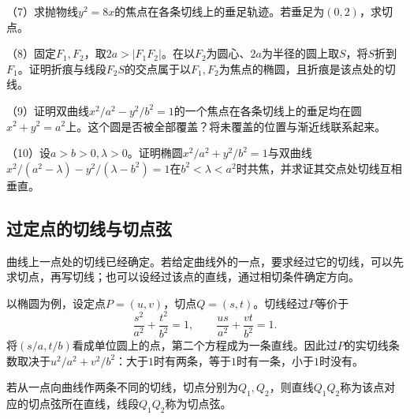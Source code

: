 \begin{exercise}
\begin{samepage}
（7）求抛物线\(y^2=8x\)的焦点在各条切线上的垂足轨迹。若垂足为\((0,2)\)，求切点。
\par
\end{samepage}

\begin{samepage}
（8）固定\(F_1,F_2\)，取\(2a>|F_1F_2|\)。在以\(F_2\)为圆心、\(2a\)为半径的圆上取\(S\)，将\(S\)折到\(F_1\)。证明折痕与线段\(F_2S\)的交点属于以\(F_1,F_2\)为焦点的椭圆，且折痕是该点处的切线。
\par
\end{samepage}

\begin{samepage}
（9）证明双曲线\(x^2/a^2-y^2/b^2=1\)的一个焦点在各条切线上的垂足均在圆\(x^2+y^2=a^2\)上。这个圆是否被全部覆盖？将未覆盖的位置与渐近线联系起来。
\par
\end{samepage}

\begin{samepage}
（10）设\(a>b>0,\lambda>0\)。证明椭圆\(x^2/a^2+y^2/b^2=1\)与双曲线\(x^2/(a^2-\lambda)-y^2/(\lambda-b^2)=1\)在\(b^2<\lambda<a^2\)时共焦，并求证其交点处切线互相垂直。
\par
\end{samepage}
\end{exercise}

\subsection{过定点的切线与切点弦}
\label{subsec:quadratic-tangents-from-a-point}

曲线上一点处的切线已经确定。若给定曲线外的一点，要求经过它的切线，可以先求切点，再写切线；也可以设经过该点的直线，通过相切条件确定方向。

以椭圆为例，设定点\(P=(u,v)\)，切点\(Q=(s,t)\)。切线经过\(P\)等价于
\begin{equation*}
 \frac{s^2}{a^2}+\frac{t^2}{b^2}=1,\qquad
 \frac{us}{a^2}+\frac{vt}{b^2}=1.
\end{equation*}
将\((s/a,t/b)\)看成单位圆上的点，第二个方程成为一条直线。因此过\(P\)的实切线条数取决于\(u^2/a^2+v^2/b^2\)：大于\(1\)时有两条，等于\(1\)时有一条，小于\(1\)时没有。

\begin{definition}
若从一点向曲线作两条不同的切线，切点分别为\(Q_1,Q_2\)，则直线\(Q_1Q_2\)称为该点对应的{\heiti{}切点弦所在直线}，线段\(Q_1Q_2\)称为{\heiti{}切点弦}。
\end{definition}

